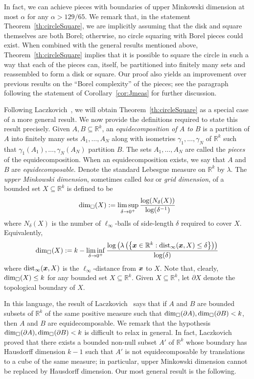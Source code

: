 \documentclass[12pt,a4paper]{amsart}
\numberwithin{equation}{section}
\theoremstyle{definition}
\begin{document}
In fact, we can achieve pieces with boundaries of upper Minkowski dimension at most $\alpha$ for any $\alpha>129/65$. We remark that, in the statement Theorem~\ref{th:circleSquare}, we are implicitly assuming that the  disk and square themselves are both Borel; otherwise, no circle squaring with Borel pieces could exist.  When combined with the general results mentioned above, Theorem~\ref{th:circleSquare} implies that it is possible to square the circle in such a way that each of the pieces can, itself, be partitioned into finitely many sets and reassembled to form a disk or square. Our proof also yields an improvement over previous results on the ``Borel complexity'' of the pieces; see the paragraph following the statement of Corollary~\ref{cor:Jmeas} for further discussion. 

Following Laczkovich~\cite{Laczkovich92,Laczkovich92b}, we will obtain Theorem~\ref{th:circleSquare} as a special case of a more general result. We now provide the definitions required to state this result precisely. Given $A,B\subseteq \mathbb{R}^k$, an \emph{equidecomposition of $A$ to $B$} is a partition of $A$ into finitely many sets $A_1,\dots,A_N$ along with isometries $\gamma_1,\dots,\gamma_N$ of $\mathbb{R}^k$ such that $\gamma_1(A_1),\dots,\gamma_N(A_N)$ partition $B$. The sets $A_1,\dots,A_N$ are called the \emph{pieces} of the equidecomposition. When an equidecomposition exists, we say that $A$ and $B$ are \emph{equidecomposable}. Denote the standard Lebesgue measure on $\mathbb{R}^k$ by $\lambda$. The \emph{upper Minkowski dimension}, sometimes called \emph{box} or \emph{grid dimension}, of a bounded set $X\subseteq \mathbb{R}^k$ is defined to be 
\[\operatorname{dim}_\square(X):=\limsup_{\delta\to0^+}\frac{\log(N_{\delta}(X))}{\log(\delta^{-1})}\]
where $N_\delta(X)$ is the number of $\ell_\infty$-balls of side-length $\delta$ required to cover $X$. Equivalently, 
\[\operatorname{dim}_\square(X):=k-\liminf_{\delta\to 0^+}\frac{\log\left(\lambda\left(\left\{\boldsymbol{x}\in\mathbb{R}^k: \operatorname{dist}_\infty(\boldsymbol{x},X)\leq \delta\right\}\right)\right)}{\log(\delta)}\]
where $\operatorname{dist}_\infty(\boldsymbol{x},X)$ is the $\ell_\infty$-distance from $\boldsymbol{x}$ to $X$. Note that, clearly, $\operatorname{dim}_\square(X)\leq k$ for any bounded set $X\subseteq \mathbb{R}^k$. Given $X\subseteq \mathbb{R}^k$, let $\partial X$ denote the topological boundary of $X$. 

In this language, the result of Laczkovich~\cite{Laczkovich92,Laczkovich92b} says that if $A$ and $B$ are bounded subsets of $\mathbb{R}^k$ of the same positive measure such that $\operatorname{dim}_\square(\partial A),\operatorname{dim}_\square(\partial B)<k$, then $A$ and $B$ are equidecomposable. We remark that the hypothesis $\operatorname{dim}_\square(\partial A),\operatorname{dim}_\square(\partial B)< k$ is difficult to relax in general. In fact, Laczkovich~\cite[Corollary 3.5]{Laczkovich93} proved that there exists a bounded non-null subset $A'$ of $\mathbb{R}^k$ whose boundary has Hausdorff dimension $k-1$ such that $A'$ is not equidecomposable by translations to a cube of the same measure; in particular, upper Minkowski dimension cannot be replaced by Hausdorff dimension. Our most general result is the following. 
\end{document}

